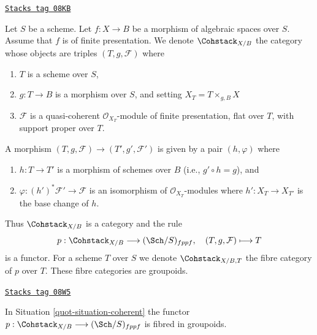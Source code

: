 \begin{definition}
\label{quot-situation-coherent}
\href{https://stacks.math.columbia.edu/tag/08KB}{\texttt{Stacks tag 08KB}}

Let $S$ be a scheme. Let $f : X \to B$ be a morphism of algebraic spaces
over $S$. Assume that $f$ is of finite presentation.
We denote $\Cohstack_{X/B}$ the category whose objects are
triples $(T, g, \mathcal{F})$ where
\begin{enumerate}
\item $T$ is a scheme over $S$,
\item $g : T \to B$ is a morphism over $S$, and setting
$X_T = T \times_{g, B} X$
\item $\mathcal{F}$ is a quasi-coherent $\mathcal{O}_{X_T}$-module
of finite presentation, flat over $T$, with support proper over $T$.
\end{enumerate}
A morphism $(T, g, \mathcal{F}) \to (T', g', \mathcal{F}')$
is given by a pair $(h, \varphi)$ where
\begin{enumerate}
\item $h : T \to T'$ is a morphism of schemes over $B$
(i.e., $g' \circ h = g$), and
\item $\varphi : (h')^*\mathcal{F}' \to \mathcal{F}$ is an
isomorphism of $\mathcal{O}_{X_T}$-modules where $h' : X_T \to X_{T'}$
is the base change of $h$.
\end{enumerate}
\end{definition}

Thus $\Cohstack_{X/B}$ is a category and the rule
$$
p : \Cohstack_{X/B} \longrightarrow (\Sch/S)_{fppf},
\quad
(T, g, \mathcal{F}) \longmapsto T
$$
is a functor. For a scheme $T$ over $S$ we denote $\Cohstack_{X/B, T}$
the fibre category of $p$ over $T$. These fibre categories are groupoids.

\begin{lemma}
\label{quot-lemma-coherent-fibred-in-groupoids}
\href{https://stacks.math.columbia.edu/tag/08W5}{\texttt{Stacks tag 08W5}}

In Situation \ref{quot-situation-coherent} the functor
$p : \Cohstack_{X/B} \longrightarrow (\Sch/S)_{fppf}$
is fibred in groupoids.
\end{lemma}

